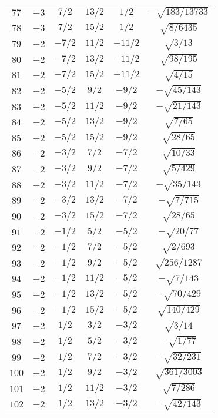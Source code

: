 \begin{table}
\begin{center}
\begin{tabular}{|c|c|c|c|c|c|}
$77$ & $-3$ & $7/2$ & $13/2$ & $1/2$ & $-\sqrt{183/13733}$ \\ 
$78$ & $-3$ & $7/2$ & $15/2$ & $1/2$ & $\sqrt{8/6435}$ \\ 
$79$ & $-2$ & $-7/2$ & $11/2$ & $-11/2$ & $\sqrt{3/13}$ \\ 
$80$ & $-2$ & $-7/2$ & $13/2$ & $-11/2$ & $\sqrt{98/195}$ \\ 
$81$ & $-2$ & $-7/2$ & $15/2$ & $-11/2$ & $\sqrt{4/15}$ \\ 
$82$ & $-2$ & $-5/2$ & $9/2$ & $-9/2$ & $-\sqrt{45/143}$ \\ 
$83$ & $-2$ & $-5/2$ & $11/2$ & $-9/2$ & $-\sqrt{21/143}$ \\ 
$84$ & $-2$ & $-5/2$ & $13/2$ & $-9/2$ & $\sqrt{7/65}$ \\ 
$85$ & $-2$ & $-5/2$ & $15/2$ & $-9/2$ & $\sqrt{28/65}$ \\ 
$86$ & $-2$ & $-3/2$ & $7/2$ & $-7/2$ & $\sqrt{10/33}$ \\ 
$87$ & $-2$ & $-3/2$ & $9/2$ & $-7/2$ & $\sqrt{5/429}$ \\ 
$88$ & $-2$ & $-3/2$ & $11/2$ & $-7/2$ & $-\sqrt{35/143}$ \\ 
$89$ & $-2$ & $-3/2$ & $13/2$ & $-7/2$ & $-\sqrt{7/715}$ \\ 
$90$ & $-2$ & $-3/2$ & $15/2$ & $-7/2$ & $\sqrt{28/65}$ \\ 
$91$ & $-2$ & $-1/2$ & $5/2$ & $-5/2$ & $-\sqrt{20/77}$ \\ 
$92$ & $-2$ & $-1/2$ & $7/2$ & $-5/2$ & $\sqrt{2/693}$ \\ 
$93$ & $-2$ & $-1/2$ & $9/2$ & $-5/2$ & $\sqrt{256/1287}$ \\ 
$94$ & $-2$ & $-1/2$ & $11/2$ & $-5/2$ & $-\sqrt{7/143}$ \\ 
$95$ & $-2$ & $-1/2$ & $13/2$ & $-5/2$ & $-\sqrt{70/429}$ \\ 
$96$ & $-2$ & $-1/2$ & $15/2$ & $-5/2$ & $\sqrt{140/429}$ \\ 
$97$ & $-2$ & $1/2$ & $3/2$ & $-3/2$ & $\sqrt{3/14}$ \\ 
$98$ & $-2$ & $1/2$ & $5/2$ & $-3/2$ & $-\sqrt{1/77}$ \\ 
$99$ & $-2$ & $1/2$ & $7/2$ & $-3/2$ & $-\sqrt{32/231}$ \\ 
$100$ & $-2$ & $1/2$ & $9/2$ & $-3/2$ & $\sqrt{361/3003}$ \\ 
$101$ & $-2$ & $1/2$ & $11/2$ & $-3/2$ & $\sqrt{7/286}$ \\ 
$102$ & $-2$ & $1/2$ & $13/2$ & $-3/2$ & $-\sqrt{42/143}$ \\ 

\end{tabular}
\end{center}
\end{table}
